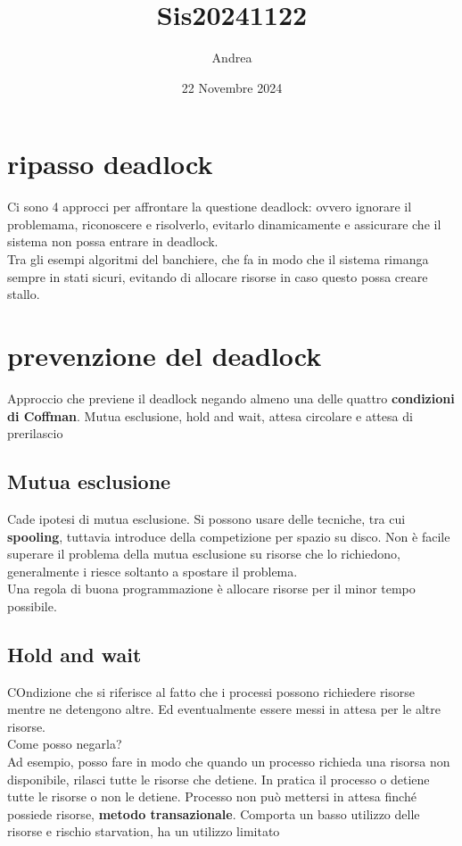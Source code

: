\documentclass{article}
\title{Sis20241122}
\author{Andrea}
\date{22 Novembre 2024}
\begin{document}
\maketitle
\tableofcontents
\section{ripasso deadlock}
Ci sono 4 approcci per affrontare la questione deadlock: ovvero ignorare il problemama, riconoscere e risolverlo, evitarlo dinamicamente
e assicurare che il sistema non possa entrare in deadlock.\\
Tra gli esempi algoritmi del banchiere, che fa in modo che il sistema rimanga sempre in stati sicuri, evitando di allocare risorse in caso
questo possa creare stallo.\\

\section{prevenzione del deadlock}
Approccio che previene il deadlock negando almeno una delle quattro \textbf{condizioni di Coffman}. 
Mutua esclusione, hold and wait, attesa circolare e attesa di prerilascio

\subsection{Mutua esclusione}
Cade ipotesi di mutua esclusione. Si possono usare delle tecniche, tra cui \textbf{spooling}, tuttavia introduce della competizione 
per spazio su disco. Non è facile superare il problema della mutua esclusione su risorse che lo richiedono, generalmente i riesce soltanto
a spostare il problema.\\
Una regola di buona programmazione è allocare risorse per il minor tempo possibile.
\subsection{Hold and wait}
COndizione che si riferisce al fatto che i processi possono richiedere risorse mentre ne detengono altre.
Ed eventualmente essere messi in 
attesa per le altre risorse.\\
Come posso negarla?\\
Ad esempio, posso fare in modo che quando un processo richieda una risorsa non disponibile, rilasci tutte le risorse che detiene. In pratica
il processo o detiene tutte le risorse o non le detiene. Processo non può mettersi in attesa finché possiede risorse, \textbf{metodo transazionale}.
Comporta un basso utilizzo delle risorse e rischio starvation, ha un utilizzo limitato\\
\end{document}
